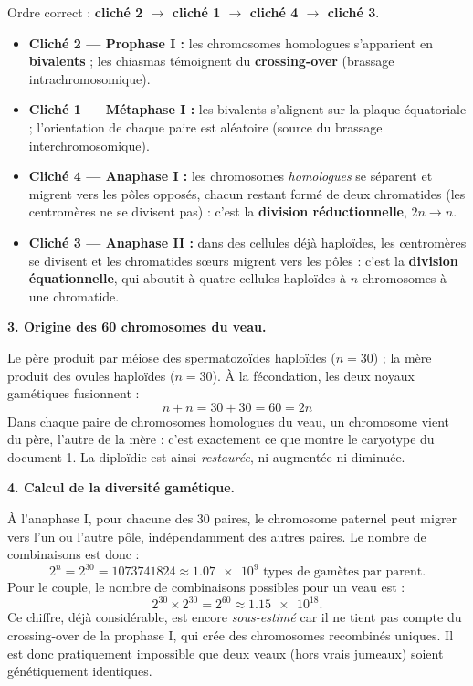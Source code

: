 \documentclass[11pt]{article}
\begin{document}
\begin{exoresolu}
Ordre correct : \textbf{cliché 2 $\rightarrow$ cliché 1 $\rightarrow$ cliché 4 $\rightarrow$ cliché 3}.

\begin{itemize}
\item \textbf{Cliché 2 — Prophase I :} les chromosomes homologues s'apparient en \textbf{bivalents} ; les chiasmas témoignent du \textbf{crossing-over} (brassage intrachromosomique).
\item \textbf{Cliché 1 — Métaphase I :} les bivalents s'alignent sur la plaque équatoriale ; l'orientation de chaque paire est aléatoire (source du brassage interchromosomique).
\item \textbf{Cliché 4 — Anaphase I :} les chromosomes \emph{homologues} se séparent et migrent vers les pôles opposés, chacun restant formé de deux chromatides (les centromères ne se divisent pas) : c'est la \textbf{division réductionnelle}, $2n \rightarrow n$.
\item \textbf{Cliché 3 — Anaphase II :} dans des cellules déjà haploïdes, les centromères se divisent et les chromatides sœurs migrent vers les pôles : c'est la \textbf{division équationnelle}, qui aboutit à quatre cellules haploïdes à $n$ chromosomes à une chromatide.
\end{itemize}

\medskip
\textbf{3. Origine des 60 chromosomes du veau.}

Le père produit par méiose des spermatozoïdes haploïdes ($n = 30$) ; la mère produit des ovules haploïdes ($n = 30$). À la fécondation, les deux noyaux gamétiques fusionnent :
\[
n + n = 30 + 30 = 60 = 2n
\]
Dans chaque paire de chromosomes homologues du veau, un chromosome vient du père, l'autre de la mère : c'est exactement ce que montre le caryotype du document 1. La diploïdie est ainsi \emph{restaurée}, ni augmentée ni diminuée.

\medskip
\textbf{4. Calcul de la diversité gamétique.}

À l'anaphase I, pour chacune des 30 paires, le chromosome paternel peut migrer vers l'un ou l'autre pôle, indépendamment des autres paires. Le nombre de combinaisons est donc :
\[
2^{n} = 2^{30} = \num{1073741824} \approx \num{1,07e9} \text{ types de gamètes par parent.}
\]
Pour le couple, le nombre de combinaisons possibles pour un veau est :
\[
2^{30} \times 2^{30} = 2^{60} \approx \num{1,15e18}.
\]
Ce chiffre, déjà considérable, est encore \emph{sous-estimé} car il ne tient pas compte du crossing-over de la prophase I, qui crée des chromosomes recombinés uniques. Il est donc pratiquement impossible que deux veaux (hors vrais jumeaux) soient génétiquement identiques.


\end{exoresolu}
\end{document}
